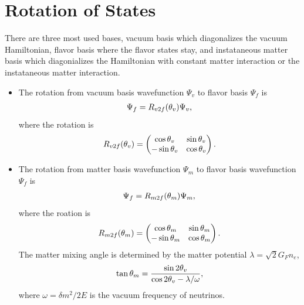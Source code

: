 \documentclass[letterpaper,12pt,english]{sphinxmanual}
\begin{document}
\section{Rotation of States}
\label{basis:rotation-of-states}
There are three most used bases, vacuum basis which diagonalizes the vacuum Hamiltonian, flavor basis where the flavor states stay, and instataneous matter basis which diagonializes the Hamiltonian with constant matter interaction or the instataneous matter interaction.
\begin{itemize}
\item {} 
The rotation from vacuum basis wavefunction \(\Psi_v\) to flavor basis \(\Psi_f\) is
\begin{gather}
\begin{split}\Psi_f = R_{v2f}(\theta_v) \Psi_v,\end{split}\notag
\end{gather}
where the rotation is
\begin{gather}
\begin{split}R_{v2f}(\theta_v) = \begin{pmatrix} \cos\theta_v & \sin \theta_v \\ -\sin \theta_v & \cos \theta_v \end{pmatrix}.\end{split}\notag
\end{gather}
\item {} 
The rotation from matter basis wavefunction \(\Psi_m\) to flavor basis wavefunction \(\Psi_f\) is
\begin{gather}
\begin{split}\Psi_f = R_{m2f}(\theta_m) \Psi_m,\end{split}\notag
\end{gather}
where the roation is
\begin{gather}
\begin{split}R_{m2f}(\theta_m) = \begin{pmatrix} \cos\theta_m & \sin \theta_m \\ -\sin \theta_m & \cos \theta_m \end{pmatrix}.\end{split}\notag
\end{gather}
The matter mixing angle is determined by the matter potential \(\lambda = \sqrt{2}G_F n_e\),
\begin{gather}
\begin{split}\tan\theta_m = \frac{\sin 2\theta_v}{\cos 2\theta_v - \lambda/\omega},\end{split}\notag
\end{gather}
where \(\omega = \delta m^2 /2E\) is the vacuum frequency of neutrinos.

\end{itemize}
\end{document}
